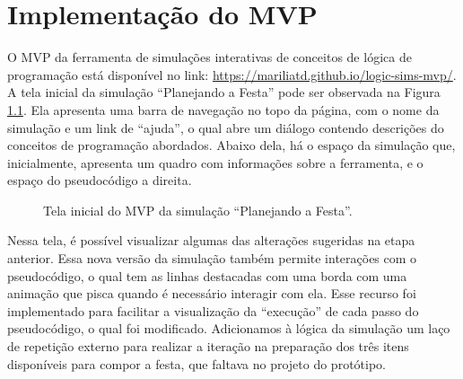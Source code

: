 

\newcommand{\sla}{\textbackslash}

\newcommand{\cmd}[1]{\textsf{#1}}

\newcommand{\pkg}[1]{\textsf{#1}}

\newcommand{\ltxcmd}[1]{\cmd{\sla{}#1}}

\chapter{Implementação do MVP} 

O MVP da ferramenta de simulações interativas de conceitos de lógica de programação está disponível no link: \url{https://mariliatd.github.io/logic-sims-mvp/}. A tela inicial da simulação \enquote{Planejando a Festa} pode ser observada na Figura \ref{figure:tela_inicial}. Ela apresenta uma barra de navegação no topo da página, com o nome da simulação e um link de \enquote{ajuda}, o qual abre um diálogo contendo descrições do conceitos de programação abordados. Abaixo dela, há o espaço da simulação que, inicialmente, apresenta um quadro com informações sobre a ferramenta, e o espaço do pseudocódigo a direita.

\begin{figure}[h!]
    \centering
    \setlength{\fboxrule}{0.1pt} %
    \caption{Tela inicial do MVP da simulação \enquote{Planejando a Festa}.}
    \label{figure:tela_inicial}
\end{figure}

Nessa tela, é possível visualizar algumas das alterações sugeridas na etapa anterior. Essa nova versão da simulação também permite interações com o pseudocódigo, o qual tem as linhas destacadas com uma borda com uma animação que pisca quando é necessário interagir com ela. Esse recurso foi implementado para facilitar a visualização da \enquote{execução} de cada passo do pseudocódigo, o qual foi modificado. Adicionamos à lógica da simulação um laço de repetição externo para realizar a iteração na preparação dos três itens disponíveis para compor a festa, que faltava no projeto do protótipo.

